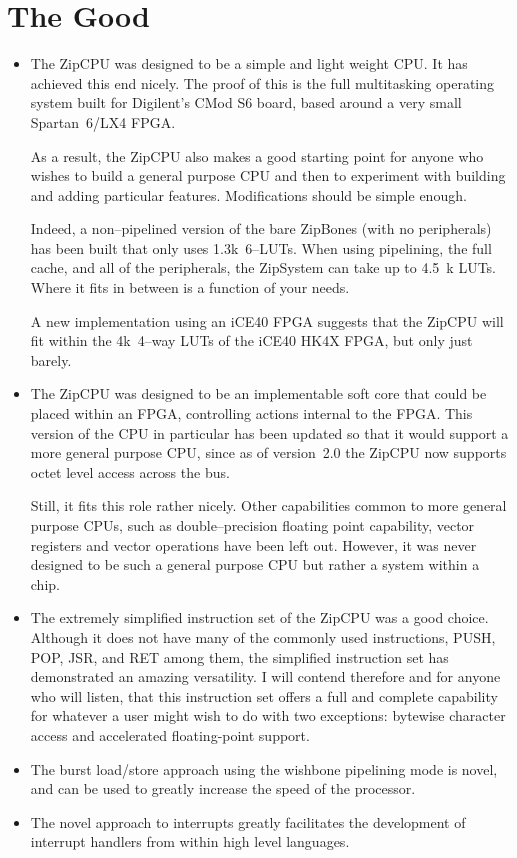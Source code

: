 \documentclass{gqtekspec}
\begin{document}
\section{The Good}
\begin{itemize}
\item The ZipCPU was designed to be a simple and light weight CPU.  It has
	achieved this end nicely.  The proof of this is the full multitasking
	operating system built for Digilent's CMod S6 board, based around
	a very small Spartan~6/LX4 FPGA. 

	As a result, the ZipCPU also makes a good starting point for anyone
	who wishes to build a general purpose CPU and then to experiment with
	building and adding particular features.  Modifications should be
	simple enough. 

	Indeed, a non--pipelined version of the bare ZipBones (with no
	peripherals) has been built that only uses 1.3k~6--LUTs.  When using
	pipelining, the full cache, and all of the peripherals, the ZipSystem
	can take up to 4.5~k LUTs.  Where it fits in between is a function of
	your needs.

	A new implementation using an iCE40 FPGA suggests that the ZipCPU
	will fit within the 4k~4--way LUTs of the iCE40 HK4X FPGA, but only
	just barely.

\item The ZipCPU was designed to be an implementable soft core that could be
	placed within an FPGA, controlling actions internal to the FPGA.  This
	version of the CPU in particular has been updated so that it would
	support a more general purpose CPU, since as of version~2.0 the ZipCPU
	now supports octet level access across the bus. 

	Still, it fits this role rather nicely.  Other capabilities common
	to more general purpose CPUs, such as 
	double--precision floating point capability, vector registers and
	vector operations have been left out.  However, it was never designed
	to be such a general purpose CPU but rather a system within a chip.  

\item The extremely simplified instruction set of the ZipCPU was a good
	choice. Although it does not have many of the commonly used
	instructions, PUSH, POP, JSR, and RET among them, the simplified
	instruction set has demonstrated an amazing versatility. I will contend
	therefore and for anyone who will listen, that this instruction set
	offers a full and complete capability for whatever a user might wish
	to do with two exceptions: bytewise character access and accelerated
	floating-point support.
\item The burst load/store approach using the wishbone pipelining mode is
	novel, and can be used to greatly increase the speed of the processor.
\item The novel approach to interrupts greatly facilitates the development of
	interrupt handlers from within high level languages.


\end{itemize}
\end{document}
